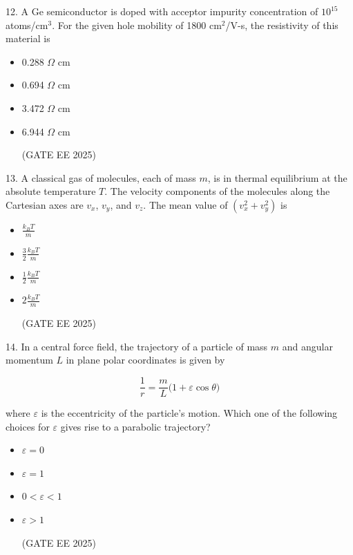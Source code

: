 \documentclass[twocolumn]{article}
\begin{document}
12. A Ge semiconductor is doped with acceptor impurity concentration of $10^{15}$ atoms/cm$^3$.  
For the given hole mobility of 1800 cm$^2$/V-s, the resistivity of this material is

\begin{itemize}
\item[(A)] 0.288 $\Omega$ cm

\item[(B)] 0.694 $\Omega$ cm

\item[(C)] 3.472 $\Omega$ cm

\item[(D)] 6.944 $\Omega$ cm

(GATE EE 2025)
  \end{itemize}




13. A classical gas of molecules, each of mass $m$, is in thermal equilibrium at the absolute temperature $T$.  
The velocity components of the molecules along the Cartesian axes are $v_x$, $v_y$, and $v_z$.  
The mean value of $(v_x^2 + v_y^2)$ is

\begin{itemize}
\item[(A)] $\frac{k_B T}{m}$

\item[(B)] $\frac{3}{2} \frac{k_B T}{m}$

\item[(C)] $\frac{1}{2} \frac{k_B T}{m}$

\item[(D)] $2 \frac{k_B T}{m}$

(GATE EE 2025)
  \end{itemize}




14. In a central force field, the trajectory of a particle of mass $m$ and angular momentum $L$ in plane polar coordinates is given by


\[
\frac{1}{r} = \frac{m}{L} \big( 1 + \varepsilon \cos \theta \big)
\]

where $\varepsilon$ is the eccentricity of the particle’s motion. Which one of the following choices for $\varepsilon$ gives rise to a parabolic trajectory?

\begin{itemize}
\item[(A)] $\varepsilon = 0$ \\
\item[(B)] $\varepsilon = 1$ \\
\item[(C)] $0 < \varepsilon < 1$ \\
\item[(D)] $\varepsilon > 1$

(GATE EE 2025)
  \end{itemize}
\end{document}
